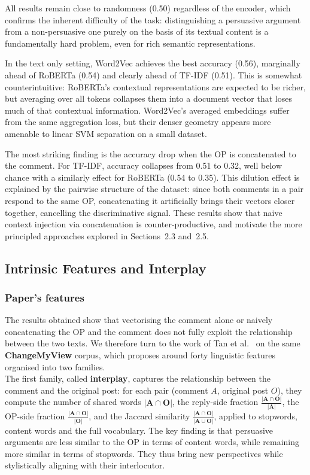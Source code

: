\documentclass[11pt,a4paper]{article}
\begin{document}
All results remain close to randomness (0.50) regardless of the encoder, which 
confirms the inherent difficulty of the task: distinguishing a persuasive 
argument from a non-persuasive one purely on the basis of its textual content 
is a fundamentally hard problem, even for rich semantic representations.


In the text only setting, Word2Vec achieves the best accuracy 
(0.56), marginally ahead of RoBERTa (0.54) and clearly ahead of TF-IDF 
(0.51). This is somewhat counterintuitive: RoBERTa's contextual 
representations are expected to be richer, but averaging over all tokens 
collapses them into a document vector that loses much of that contextual 
information. Word2Vec's averaged embeddings suffer from the same 
aggregation loss, but their denser geometry appears more amenable to 
linear SVM separation on a small dataset.

The most striking finding is the accuracy drop when the OP is 
concatenated to the comment. For TF-IDF, accuracy collapses from 0.51 to 
0.32, well below chance with a similarly effect for RoBERTa 
(0.54 to 0.35). This dilution effect is explained by the pairwise 
structure of the dataset: since both comments in a pair respond to the same 
OP, concatenating it artificially brings their vectors closer together, 
cancelling the discriminative signal. These results show that naive context 
injection via concatenation is counter-productive, and motivate the more 
principled approaches explored in Sections~2.3 and~2.5.


\subsection{Intrinsic Features and Interplay}
\subsubsection{Paper's features}

The results obtained show that vectorising the comment alone or naively
concatenating the OP and the comment does not fully exploit the relationship
between the two texts. We therefore turn to the work of Tan et
al.~\cite{tan2016winning} on the same \textbf{ChangeMyView} corpus, which
proposes around forty linguistic features organised into two families.\\

The first family, called \textbf{interplay}, captures the relationship between
the comment and the original post: for each pair (comment $A$, original post
$O$), they compute the number of shared words $\boldsymbol{|A \cap O|}$,
the reply-side fraction $\boldsymbol{\frac{|A \cap O|}{|A|}}$, the OP-side
fraction $\boldsymbol{\frac{|A \cap O|}{|O|}}$, and the Jaccard similarity
$\boldsymbol{\frac{|A \cap O|}{|A \cup O|}}$, applied to stopwords, content
words and the full vocabulary. The key finding is that persuasive arguments
are less similar to the OP in terms of content words, while remaining more
similar in terms of stopwords. They thus bring new perspectives while
stylistically aligning with their interlocutor.\\
\end{document}
